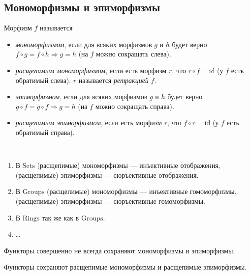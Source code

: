 \documentclass[12pt,a4paper]{article}
\newcommand{\id}{\mathrm{id}}
\newcommand{\Sets}{\mathrm{Sets}}
\newcommand{\Groups}{\mathrm{Groups}}
\newcommand{\Rings}{\mathrm{Rings}}
\begin{document}
    \subsection{Мономорфизмы и эпиморфизмы}

    \begin{definition}
        Морфизм $f$ называется
        \begin{itemize}
            \item \emph{мономорфизмом}, если для всяких морфизмов $g$ и $h$ будет верно $f \circ g = f \circ h \Rightarrow g = h$ (на $f$ можно сокращать слева).
            \item \emph{расщепимым мономорфизмом}, если есть морфизм $r$, что $r \circ f = \id$ (у $f$ есть обратимый слева). $r$ называется \emph{ретракцией} $f$.
            \item \emph{эпиморфизмом}, если для всяких морфизмов $g$ и $h$ будет верно $g \circ f = g \circ f \Rightarrow g = h$ (на $f$ можно сокращать справа).
            \item \emph{расщепимым эпиморфизмом}, если есть морфизм $r$, что $f \circ r = \id$ (у $f$ есть обратимый справа).
        \end{itemize}
    \end{definition}

    \begin{example}\ 
        \begin{enumerate}
            \item В $\Sets$ (расщепимые) мономорфизмы --- инъективные отображения, (расщепимые) эпиморфизмы --- сюръективные отображения.
            \item В $\Groups$ (расщепимые) мономорфизмы --- инъективные гомоморфизмы, (расщепимые) эпиморфизмы --- сюръективные гомоморфизмы.
            \item В $\Rings$ так же как в $\Groups$.
            \item \dots
        \end{enumerate}
    \end{example}

    \begin{remark*}
        Функторы совершенно не всегда сохраняют мономорфизмы и эпиморфизмы.
    \end{remark*}

    \begin{lemma}
        Функторы сохраняют расщепимые мономорфизмы и расщепимые эпиморфизмы.
    \end{lemma}
\end{document}
